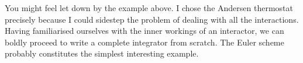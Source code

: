 You might feel let down by the example above. I chose the Andersen thermostat 
precisely because I could sidestep the problem of dealing with all the 
interactions. Having familiarised ourselves with the inner workings of an 
interactor, we can boldly proceed to write a complete integrator from scratch. 
The Euler scheme probably constitutes the simplest interesting example.

